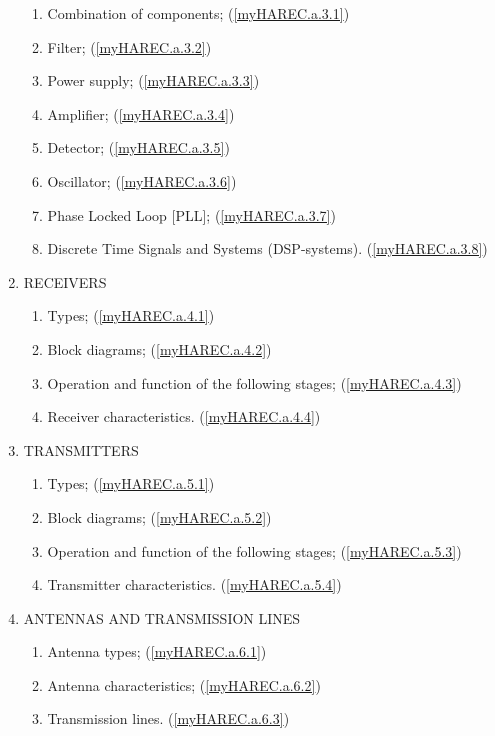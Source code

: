 \begin{enumerate}
\begin{enumerate}[noitemsep]
\item Combination of components; (\ref{myHAREC.a.3.1})\label{HAREC.a.3.1}
\item Filter; (\ref{myHAREC.a.3.2})\label{HAREC.a.3.2}
\item Power supply; (\ref{myHAREC.a.3.3})\label{HAREC.a.3.3}
\item Amplifier; (\ref{myHAREC.a.3.4})\label{HAREC.a.3.4}
\item Detector; (\ref{myHAREC.a.3.5})\label{HAREC.a.3.5}
\item Oscillator; (\ref{myHAREC.a.3.6})\label{HAREC.a.3.6}
\item Phase Locked Loop [PLL]; (\ref{myHAREC.a.3.7})\label{HAREC.a.3.7}
\item Discrete Time Signals and Systems (DSP-systems). (\ref{myHAREC.a.3.8})\label{HAREC.a.3.8}
\end{enumerate}
\item RECEIVERS
\begin{enumerate}[noitemsep]
\item Types; (\ref{myHAREC.a.4.1})\label{HAREC.a.4.1}
\item Block diagrams; (\ref{myHAREC.a.4.2})\label{HAREC.a.4.2}
\item Operation and function of the following stages; (\ref{myHAREC.a.4.3})\label{HAREC.a.4.3}
\item Receiver characteristics. (\ref{myHAREC.a.4.4})\label{HAREC.a.4.4}
\end{enumerate}
\item TRANSMITTERS
\begin{enumerate}[noitemsep]
\item Types; (\ref{myHAREC.a.5.1})\label{HAREC.a.5.1}
\item Block diagrams; (\ref{myHAREC.a.5.2})\label{HAREC.a.5.2}
\item Operation and function of the following stages; (\ref{myHAREC.a.5.3})\label{HAREC.a.5.3}
\item Transmitter characteristics. (\ref{myHAREC.a.5.4})\label{HAREC.a.5.4}
\end{enumerate}
\item ANTENNAS AND TRANSMISSION LINES
\begin{enumerate}[noitemsep]
\item Antenna types; (\ref{myHAREC.a.6.1})\label{HAREC.a.6.1}
\item Antenna characteristics; (\ref{myHAREC.a.6.2})\label{HAREC.a.6.2}
\item Transmission lines. (\ref{myHAREC.a.6.3})\label{HAREC.a.6.3}

\end{enumerate}
\end{enumerate}

